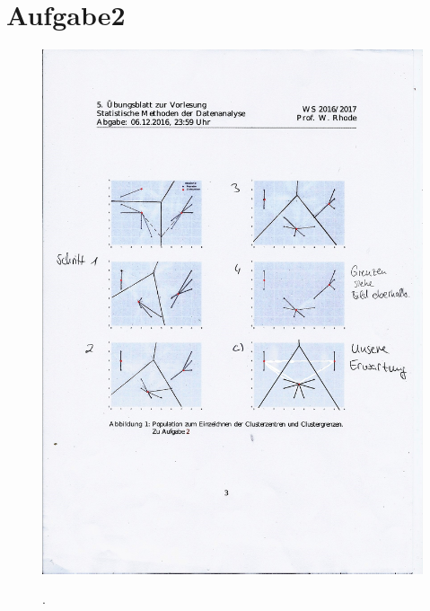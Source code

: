 \newpage
\section{Aufgabe2}
\label{sec:a2}
\begin{figure}
  \centering
  \includegraphics[width=\textwidth]{PhotoScan1.jpg}
  \caption{}.
  \label{fig:1}
\end{figure}
\FloatBarrier
